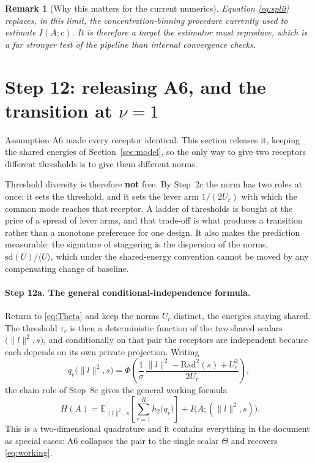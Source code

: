 \documentclass[11pt,a4paper]{article}
\newtheorem{remark}{Remark}
\newcommand{\EE}{\mathbb{E}}
\newcommand{\sd}{\mathrm{sd}}
\newcommand{\Phibar}{\overline{\Phi}}
\newcommand{\htwo}{h_2}
\begin{document}
\begin{remark}[Why this matters for the current numerics]
Equation \eqref{eq:split} replaces, in this limit, the concentration-binning procedure
currently used to estimate $I(A;c)$. It is therefore a target the estimator must
reproduce, which is a far stronger test of the pipeline than internal convergence checks.
\end{remark}

\section{Step 12: releasing A6, and the transition at $\nu=1$}
\label{sec:stagger}

Assumption A6 made every receptor identical. This section releases it, keeping the shared
energies of Section~\ref{sec:model}, so the only way to give two receptors different
thresholds is to give them different norms.

Threshold diversity is therefore \textbf{not} free. By Step~2c the norm has two roles at
once: it sets the threshold, and it sets the lever arm $1/(2U_r)$ with which the common
mode reaches that receptor. A ladder of thresholds is bought at the price of a spread of
lever arms, and that trade-off is what produces a transition rather than a monotone
preference for one design. It also makes the prediction measurable: the signature of
staggering is the dispersion of the norms, $\sd(U)/\langle U\rangle$, which under the
shared-energy convention cannot be moved by any compensating change of baseline.

\paragraph{Step 12a. The general conditional-independence formula.} Return to
\eqref{eq:Theta} and keep the norms $U_r$ distinct, the energies staying shared. The
threshold
$\tau_r$ is then a deterministic function of the \emph{two} shared scalars
$\big(\|l\|^2, s\big)$, and conditionally on that pair the receptors are independent
because each depends on its own private projection. Writing
\begin{equation}
  q_r\big(\|l\|^2,s\big)
   = \Phibar\!\left(\frac{1}{\sigma}\,
     \frac{\|l\|^2-\mathrm{Rad}^2(s)+U_r^2}{2U_r}\right),
\end{equation}
the chain rule of Step~8c gives the general working formula
\begin{equation}
  \boxed{\;H(A)=\EE_{\|l\|^2,\,s}\!\left[\sum_{r=1}^R \htwo\big(q_r\big)\right]
   +I\big(A;(\|l\|^2,s)\big). }
  \label{eq:general}
\end{equation}
This is a two-dimensional quadrature and it contains everything in the document as
special cases: A6 collapses the pair to the single scalar $\Theta$ and recovers
\eqref{eq:working}.
\end{document}
